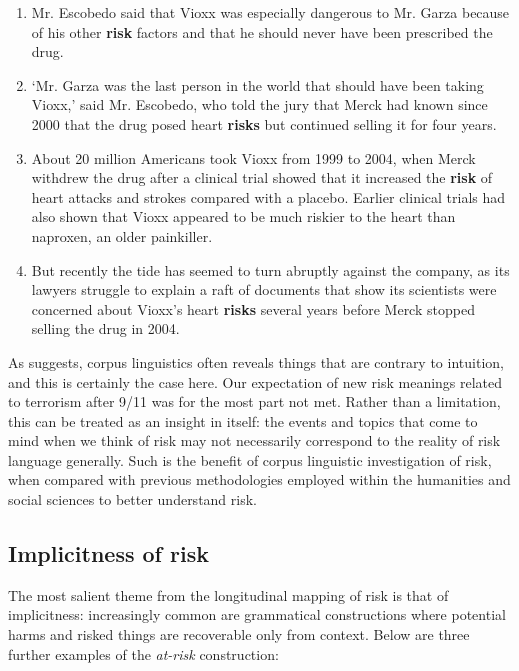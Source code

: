 \begin{enumerate}  [before=\itshape,font=\normalfont] \setlength\itemsep{0em} \small
\item Mr. Escobedo said that Vioxx was especially dangerous to Mr. Garza because of his other \textbf{risk} factors and that he should never have been prescribed the drug.
\item `Mr. Garza was the last person in the world that should have been taking Vioxx,' said Mr. Escobedo, who told the jury that Merck had known since 2000 that the drug posed heart \textbf{risks} but continued selling it for four years.
\item About 20 million Americans took Vioxx from 1999 to 2004, when Merck withdrew the drug after a clinical trial showed that it increased the \textbf{risk} of heart attacks and strokes compared with a placebo. Earlier clinical trials had also shown that Vioxx appeared to be much riskier to the heart than naproxen, an older painkiller.
\item But recently the tide has seemed to turn abruptly against the company, as its lawyers struggle to explain a raft of documents that show its scientists were concerned about Vioxx's heart \textbf{risks} several years before Merck stopped selling the drug in 2004. 
\end{enumerate}
%
As  suggests, corpus linguistics often reveals things that are contrary to intuition, and this is certainly the case here. Our expectation of new risk meanings related to terrorism after 9\slash 11 was for the most part not met. Rather than a limitation, this can be treated as an insight in itself: the events and topics that come to mind when we think of risk may not necessarily correspond to the reality of risk language generally. Such is the benefit of corpus linguistic investigation of risk, when compared with previous methodologies employed within the humanities and social sciences to better understand risk.

\subsection{Implicitness of risk}

The most salient theme from the longitudinal mapping of risk is that of implicitness: increasingly common are grammatical constructions where potential harms and risked things are recoverable only from context. Below are three further examples of the \emph{at-risk} construction:

